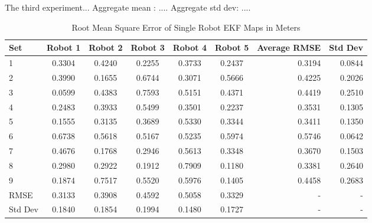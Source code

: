 \documentclass[12pt]{report}
\begin{document}
The third experiment...
Aggregate mean : ....
Aggregate std dev: ....
\begin{center}
\begin{table}[h]
  \caption{Root Mean Square Error of Single Robot EKF Maps in Meters}
  \begin{tabular}{| l | c | c | c | c | c || r ||r |}
    \hline
     Set & Robot 1 & Robot 2 & Robot 3 & Robot 4 & Robot 5 & Average RMSE & Std Dev \\ \hline \hline
     1 & 0.3304 & 0.4240 & 0.2255 & 0.3733 & 0.2437 & 0.3194 & 0.0844\\ \hline
     2 & 0.3990 & 0.1655 & 0.6744 & 0.3071 & 0.5666 & 0.4225 & 0.2026\\ \hline
     3 & 0.0599 & 0.4383 & 0.7593 & 0.5151 & 0.4371 & 0.4419 & 0.2510\\ \hline
     4 & 0.2483 & 0.3933 & 0.5499 & 0.3501 & 0.2237 & 0.3531 & 0.1305\\ \hline
     5 & 0.1555 & 0.3135 & 0.3689 & 0.5330 & 0.3344 & 0.3411 & 0.1350\\ \hline
     6 & 0.6738 & 0.5618 & 0.5167 & 0.5235 & 0.5974 & 0.5746 & 0.0642\\ \hline
     7 & 0.4676 & 0.1768 & 0.2946 & 0.5613 & 0.3348 & 0.3670 & 0.1503\\ \hline
     8 & 0.2980 & 0.2922 & 0.1912 & 0.7909 & 0.1180 & 0.3381 & 0.2640\\ \hline
     9 & 0.1874 & 0.7517 & 0.5520 & 0.5976 & 0.1405 & 0.4458 & 0.2683\\ \hline
    \hline
    RMSE & 0.3133 & 0.3908 & 0.4592 & 0.5058 & 0.3329 & - & -\\ \hline
    Std Dev & 0.1840 & 0.1854 & 0.1994 & 0.1480 & 0.1727 & - & -\\ \hline
    \hline
  \end{tabular}
  \end{table}
\end{center}
\end{document}
